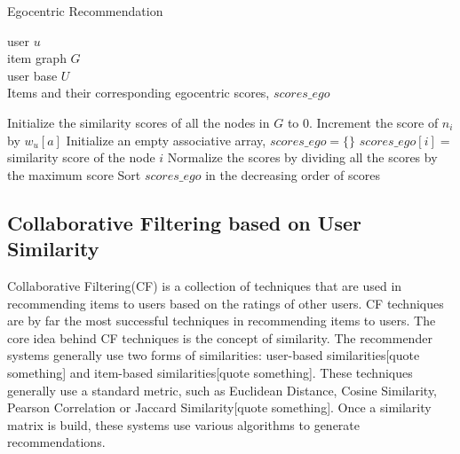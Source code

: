 \documentclass{acm_proc_article-sp}
\begin{document}
\begin{algorithm}
\label{egocentric_algo}
\caption{Egocentric Recommendation}
\begin{algorithmic}[1]
\renewcommand{\algorithmicrequire}{\textbf{Input:}}
\renewcommand{\algorithmicensure}{\textbf{Output:}}

\REQUIRE user $u$\\
item graph $G$\\
user base $U$\\
\ENSURE Items and their corresponding egocentric scores, $scores\_ego$

\STATE Initialize the similarity scores of all the nodes in $G$ to 0.
      \STATE Increment the score of $n_i$ by $w_u[a]$
    \ENDFOR
  \ENDFOR
\ENDFOR
\STATE Initialize an empty associative array, $scores\_ego = \{ \}$ 
  \STATE $scores\_ego[i] =$ similarity score of the node $i$
\ENDFOR
\STATE Normalize the scores by dividing all the scores by the maximum score
\STATE Sort $scores\_ego$ in the decreasing order of scores
\end{algorithmic}
\end{algorithm}


\subsection{Collaborative Filtering based on User Similarity}
\label{sec:collab}
Collaborative Filtering(CF) is a collection of techniques that are used in recommending items to users based on the ratings of other users. CF techniques are by far the most successful techniques in recommending items to users. The core idea behind CF techniques is the concept of similarity. The recommender systems generally use two forms of similarities: user-based similarities[quote something] and item-based similarities[quote something]. These techniques generally use a standard metric, such as Euclidean Distance, Cosine Similarity, Pearson Correlation or Jaccard Similarity[quote something]. Once a similarity matrix is build, these systems use various algorithms to generate recommendations. 
\end{document}
